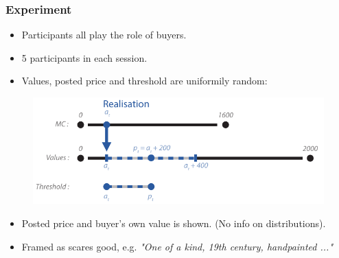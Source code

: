 \documentclass[mathserif,serif]{beamer}
\begin{document}
	\begin{frame}
		\frametitle{Experiment}
		
		\begin{itemize}
			\item Participants all play the role of buyers.
			\item 5 participants in each session.
			\item Values, posted price and threshold are uniformily random:
		\end{itemize}
		\begin{figure}[plain]
			\includegraphics[width=1\textwidth]{Figures/Distribution}
		\end{figure}
		\begin{itemize}
			\item Posted price and buyer's own value is shown. (No info on distributions).
			\item Framed as scares good, e.g. {\it "One of a kind, 19th century, handpainted ..."}
		\end{itemize}
		
	\end{frame}
\end{document}
